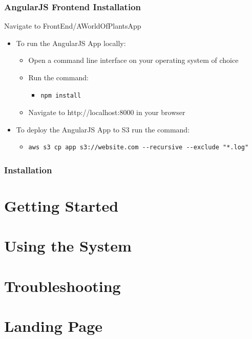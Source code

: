 \documentclass{article}
\begin{document}
		\subsubsection{AngularJS Frontend Installation}
			Navigate to FrontEnd/AWorldOfPlantsApp
			\begin{itemize}
				\item To run the AngularJS App locally:
					\begin{itemize}
						\item Open a command line interface on your operating system of choice
						\item Run the command:
							\begin{itemize}
								\item 
\begin{lstlisting}
npm install
\end{lstlisting}
							\end{itemize}
						\item Navigate to http://localhost:8000 in your browser
					\end{itemize}
				\item To deploy the AngularJS App to S3 run the command:
					\begin{itemize}
						\item
\begin{lstlisting}
aws s3 cp app s3://website.com --recursive --exclude "*.log"
\end{lstlisting}
					\end{itemize}
			\end{itemize}
	\subsubsection{ Installation}
		

\section{Getting Started}

\section{Using the System}

\section{Troubleshooting}

\section{Landing Page}
\end{document}
